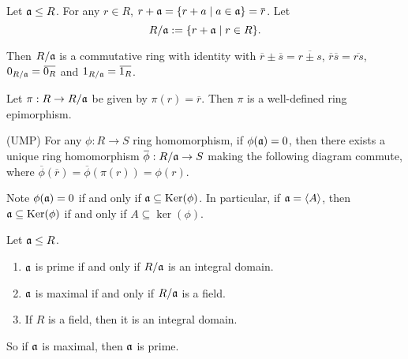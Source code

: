 \begin{construction}
    Let $\mathfrak{a} \leq R$. For any $r \in R$, $r+\ffa = \{r + a \mid a \in \ffa\} = \overbar r$. Let 
    \[R/\mathfrak{a} := \{r + \mathfrak{a} \mid r \in R\}.\] 
    \par Then $R/\mathfrak{a}$ is a commutative ring with identity with $\overbar r \pm \overbar s = \overbar {r \pm s}$, $\overbar r \overbar s = \overbar{rs}$, $0_{R/\ffa} = \overbar {0_R}$ and $1_{R/\ffa} = \overbar {1_R}$. \par
    Let $\pi: R \to R/\mathfrak{a}$ be given by $\pi(r) = \overbar r$. Then $\pi$ is a well-defined ring epimorphism. \par 
    (UMP) For any $\phi: R \to S$ ring homomorphism, if $\phi(\mathfrak{a}) = 0$, then there exists a unique ring homomorphism $\overbar \phi: R/\ffa \to S$ making the following diagram commute, where $\overbar \phi(\overbar r) = \overbar \phi (\pi(r)) = \phi(r)$. 
    \begin{center}
    \end{center}
    \par
    Note $\phi(\mathfrak{a}) = 0$ if and only if $\mathfrak{a} \subseteq \operatorname{Ker}(\phi)$. In particular, if $\mathfrak{a} = \langle A \rangle$, then $\mathfrak{a} \subseteq \operatorname{Ker}(\phi)$ if and only if $A \subseteq \ker(\phi)$.
\end{construction}

\begin{fact}
    Let $\mathfrak{a} \leq R$. 
    \begin{enumerate}
        \item $\mathfrak{a}$ is prime if and only if $R/\mathfrak{a}$ is an integral domain.
        \item $\mathfrak{a}$ is maximal if and only if $R/\mathfrak{a}$ is a field.
        \item If $R$ is a field, then it is an integral domain. 
    \end{enumerate}
    So if $\mathfrak{a}$ is maximal, then $\mathfrak{a}$ is prime.
\end{fact}

